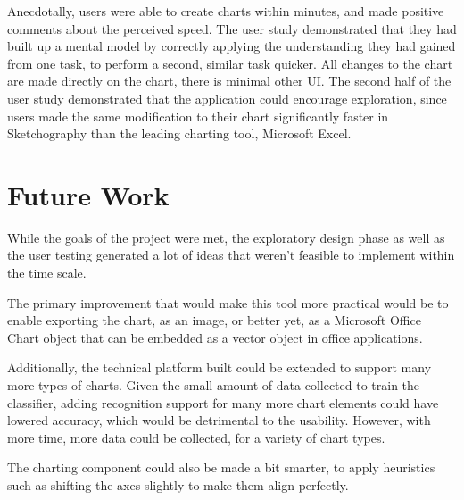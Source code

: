 	Anecdotally, users were able to create charts within minutes, and made positive comments about the perceived speed. The user study demonstrated that they had built up a mental model by correctly applying the understanding they had gained from one task, to perform a second, similar task quicker. All changes to the chart are made directly on the chart, there is minimal other UI. The second half of the user study demonstrated that the application could encourage exploration, since users made the same modification to their chart significantly faster in Sketchography than the leading charting tool, Microsoft Excel.
	
\section{Future Work}
While the goals of the project were met, the exploratory design phase as well as the user testing generated a lot of ideas that weren't feasible to implement within the time scale.

The primary improvement that would make this tool more practical would be to enable exporting the chart, as an image, or better yet, as a Microsoft Office Chart object that can be embedded as a vector object in office applications.

Additionally, the technical platform built could be extended to support many more types of charts. Given the small amount of data collected to train the classifier, adding recognition support for many more chart elements could have lowered accuracy, which would be detrimental to the usability. However, with more time, more data could be collected, for a variety of chart types.

The charting component could also be made a bit smarter, to apply heuristics such as shifting the axes slightly to make them align perfectly.